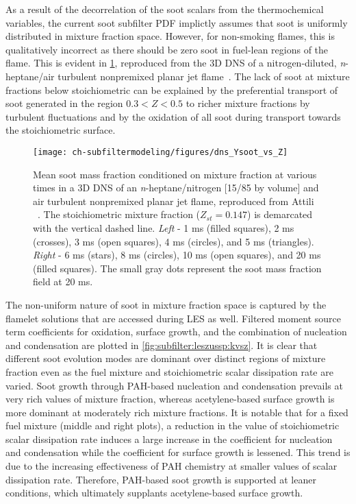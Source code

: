 As a result of the decorrelation of the soot scalars from the thermochemical variables, the current soot subfilter PDF implictly assumes that soot is uniformly distributed in mixture fraction space. However, for non-smoking flames, this is qualitatively incorrect as there should be zero soot in fuel-lean regions of the flame. This is evident in \cref{fig:subfilter:leszussp:ysvsz}, reproduced from the 3D DNS of a nitrogen-diluted, \textit{n}-heptane/air turbulent nonpremixed planar jet flame~\cite{attili2014}. The lack of soot at mixture fractions below stoichiometric can be explained by the preferential transport of soot generated in the region $0.3 < Z < 0.5$ to richer mixture fractions by turbulent fluctuations and by the oxidation of all soot during transport towards the stoichiometric surface. 

\begin{figure}[htb]
  \centering
  \texttt{[image: ch-subfiltermodeling/figures/dns\_Ysoot\_vs\_Z]}
  \caption[DNS of Turbulent Nonpremixed / Jet Flame, \texorpdfstring{$\langle Y_{\text{s}}|Z \rangle$}{<Ys|Z>} vs. \texorpdfstring{$Z$}{Z}]{Mean soot mass fraction conditioned on mixture fraction at various times in a 3D DNS of an \textit{n}-heptane/nitrogen [15/85 by volume] and air turbulent nonpremixed planar jet flame, reproduced from Attili \etal~\cite{attili2014}. The stoichiometric mixture fraction ($Z_{st} = 0.147$) is demarcated with the vertical dashed line. \textit{Left} - 1 ms (filled squares), 2 ms (crosses), 3 ms (open squares), 4 ms (circles), and 5 ms (triangles). \textit{Right} - 6 ms (stars), 8 ms (circles), 10 ms (open squares), and 20 ms (filled squares). The small gray dots represent the soot mass fraction field at 20 ms.}
  \label{fig:subfilter:leszussp:ysvsz}
\end{figure}

The non-uniform nature of soot in mixture fraction space is captured by the flamelet solutions that are accessed during LES as well. Filtered moment source term coefficients for oxidation, surface growth, and the combination of nucleation and condensation are plotted in \cref{fig:subfilter:leszussp:kvsz}. It is clear that different soot evolution modes are dominant over distinct regions of mixture fraction even as the fuel mixture and stoichiometric scalar dissipation rate are varied. Soot growth through PAH-based nucleation and condensation prevails at very rich values of mixture fraction, whereas acetylene-based surface growth is more dominant at moderately rich mixture fractions. It is notable that for a fixed fuel mixture (middle and right plots), a reduction in the value of stoichiometric scalar dissipation rate induces a large increase in the coefficient for nucleation and condensation while the coefficient for surface growth is lessened. This trend is due to the increasing effectiveness of PAH chemistry at smaller values of scalar dissipation rate. Therefore, PAH-based soot growth is supported at leaner conditions, which ultimately supplants acetylene-based surface growth.

